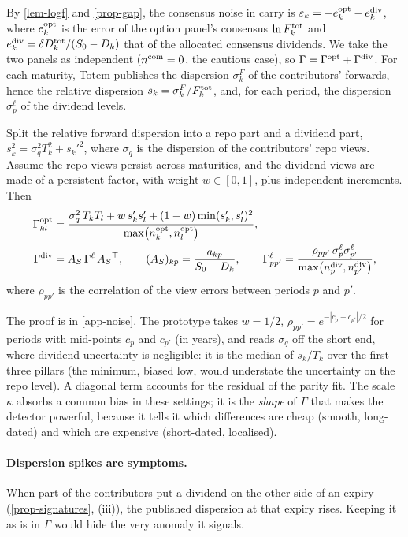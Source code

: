 By \cref{lem-logf} and \cref{prop-gap}, the consensus noise in carry is $\varepsilon_k=-e^{\mathrm{opt}}_k-e^{\mathrm{div}}_k$, where
$e^{\mathrm{opt}}_k$ is the error of the option panel's consensus $\ln F^{\mathrm{tot}}_k$ and $e^{\mathrm{div}}_k=\delta D^{\mathrm{tot}}_k/(S_0-D_k)$
that of the allocated consensus dividends. We take the two panels as independent ($n^{\mathrm{com}}=0$, the cautious case), so
$\Gamma=\Gamma^{\mathrm{opt}}+\Gamma^{\mathrm{div}}$. For each maturity, Totem publishes the dispersion $\sigma^F_k$ of the contributors'
forwards, hence the relative dispersion $s_k=\sigma^F_k/F^{\mathrm{tot}}_k$, and, for each period, the dispersion
$\sigma^\ell_p$ of the dividend levels.

\begin{proposition}\label{prop-noise}
Split the relative forward dispersion into a repo part and a dividend part, $s_k^2=\sigma_q^2T_k^2+s_k'^2$, where
$\sigma_q$ is the dispersion of the contributors' repo views. Assume the repo views persist across maturities, and the
dividend views are made of a persistent factor, with weight $w\in[0,1]$, plus independent increments. Then
\begin{align}
\Gamma^{\mathrm{opt}}_{kl}&=\frac{\sigma_q^2\,T_kT_l+w\,s'_ks'_l+(1-w)\min(s'_k, s'_l)^2}{\max\bigl(n^{\mathrm{opt}}_k, n^{\mathrm{opt}}_l\bigr)},
\label{eq-gamma-opt}\\
\Gamma^{\mathrm{div}}&=A_S\,\Gamma^\ell\,{A_S}^{\top}, \qquad(A_S)_{kp}=\frac{a_{kp}}{S_0-D_k}, \qquad
\Gamma^\ell_{pp'}=\frac{\rho_{pp'}\,\sigma^\ell_p\sigma^\ell_{p'}}{\max\bigl(n^{\mathrm{div}}_p, n^{\mathrm{div}}_{p'}\bigr)} ,
\label{eq-gamma-div}
\end{align}
where $\rho_{pp'}$ is the correlation of the view errors between periods $p$ and $p'$.
\end{proposition}
The proof is in \cref{app-noise}. The prototype takes $w=1/2$, $\rho_{pp'}=e^{-|c_p-c_{p'}|/2}$ for periods with
mid-points $c_p$ and $c_{p'}$ (in years), and reads $\sigma_q$ off the short end, where dividend uncertainty is
negligible: it is the median of $s_k/T_k$ over the first three pillars (the minimum, biased low, would understate the
uncertainty on the repo level). A diagonal term accounts for the residual of the parity fit. The scale $\kappa$ absorbs
a common bias in these settings; it is the \emph{shape} of $\Gamma$ that makes the detector powerful, because it tells
it which differences are cheap (smooth, long-dated) and which are expensive (short-dated, localised).

\paragraph{Dispersion spikes are symptoms.} When part of the contributors put a dividend on the other side of an expiry
(\cref{prop-signatures}, (iii)), the published dispersion at that expiry rises. Keeping it as is in $\Gamma$ would hide
the very anomaly it signals.

